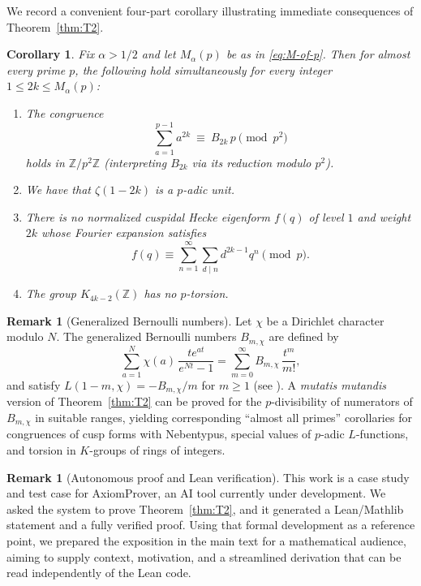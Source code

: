 \documentclass[12pt]{amsart}
\theoremstyle{plain}
\newtheorem{corollary}[theorem]{Corollary}
\theoremstyle{definition}
\newtheorem{remark}[theorem]{Remark}
\newcommand{\ZZ}{\mathbb{Z}}
\begin{document}
We record a convenient four-part corollary illustrating immediate consequences of Theorem~\ref{thm:T2}.

\begin{corollary}\label{cor:three}
Fix $\alpha>1/2$ and let $M_{\alpha}(p)$ be as in \eqref{eq:M-of-p}.
Then for almost every  prime $p$, the following hold simultaneously
for every integer $1 \le 2k \le M_{\alpha}(p)$:
\begin{enumerate}[label=\textnormal{(\arabic*)}, leftmargin=2.3em]
\item The congruence
\[
\sum_{a=1}^{p-1} a^{2k}\ \equiv\ B_{2k}\,p \pmod{p^2}
\]
holds in $\ZZ/p^2\ZZ$ (interpreting $B_{2k}$ via its reduction modulo $p^2$).
\item
We have that $\zeta(1-2k)$ is a $p$-adic unit.
\item
There is no normalized cuspidal Hecke eigenform $f(q)$ of level $1$ and weight $2k$
whose Fourier expansion satisfies
\[ f(q) \equiv \sum_{n=1}^{\infty}\sum_{d\mid n}d^{2k-1}q^n\pmod p. \]
\item
The group $K_{4k-2}(\ZZ)$ has no $p$-torsion.
\end{enumerate}
\end{corollary}


\begin{remark}[Generalized Bernoulli numbers]
Let $\chi$ be a Dirichlet character modulo $N$.
The generalized Bernoulli numbers $B_{m,\chi}$ are defined by
\[
\sum_{a=1}^{N} \chi(a)\,\frac{t e^{at}}{e^{Nt}-1}
=\sum_{m=0}^{\infty} B_{m,\chi}\,\frac{t^m}{m!},
\]
and satisfy $L(1-m,\chi)=-B_{m,\chi}/m$ for $m\ge 1$ (see \cite[Ch.~4]{Washington1997}).
A {\it mutatis mutandis} version of Theorem~\ref{thm:T2} can be proved for the
$p$-divisibility of numerators of $B_{m,\chi}$ in suitable ranges, yielding
corresponding ``almost all primes'' corollaries for congruences of cusp forms
with Nebentypus, special values of $p$-adic $L$-functions, and torsion in
$K$-groups of rings of integers.
\end{remark}


\begin{remark}[Autonomous proof and Lean verification]
This work is a case study and test case for AxiomProver, an AI tool currently under development.
We asked the system to prove Theorem~\ref{thm:T2}, and it
generated a Lean/Mathlib statement and a fully verified proof.
Using that formal development as a reference point,
we prepared the exposition in the main text for a mathematical audience, aiming to supply context,
motivation, and a streamlined derivation that can be read independently of the Lean code.
\end{remark}
\end{document}
